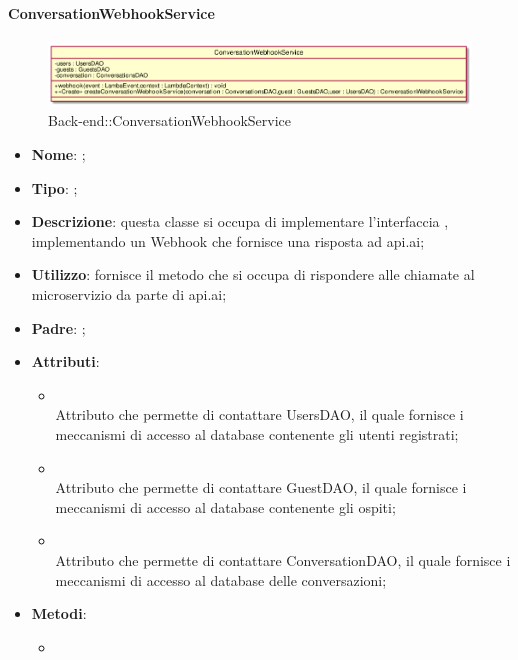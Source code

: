 \hypertarget{ConversationWebhookService_label}{\paragraph{ConversationWebhookService}}
\begin{figure}[h]
	\centering
	\includegraphics[width=\textwidth,height=\textheight,keepaspectratio]{images/ClassConversationWebhookService.png}
	\caption{Back-end::ConversationWebhookService}
\end{figure}
\begin{itemize}
	\item \textbf{Nome}: ;
	\item \textbf{Tipo}: ;
	\item \textbf{Descrizione}: questa classe si occupa di implementare l'interfaccia , implementando un Webhook che fornisce una risposta ad api.ai;
	\item \textbf{Utilizzo}: fornisce il metodo che si occupa di rispondere alle chiamate al microservizio da parte di api.ai;
	\item \textbf{Padre}: ;
	\item \textbf{Attributi}:
	\begin{itemize}
		\item[]  \\
		Attributo che permette di contattare UsersDAO, il quale fornisce i meccanismi di accesso al database contenente gli utenti registrati;
		\item[]  \\
		Attributo che permette di contattare GuestDAO, il quale fornisce i meccanismi di accesso al database contenente gli ospiti;
		\item[]  \\
		Attributo che permette di contattare ConversationDAO, il quale fornisce i meccanismi di accesso al database delle conversazioni;
	\end{itemize}
	\item \textbf{Metodi}:
	\begin{itemize}
		\item[]  \\

\end{itemize}
\end{itemize}
